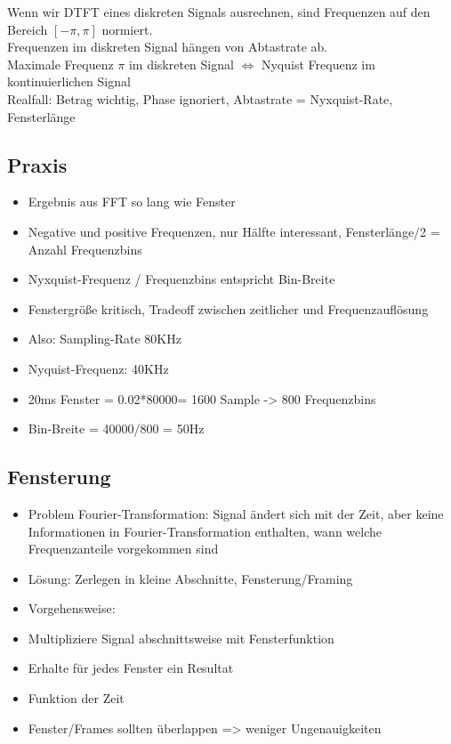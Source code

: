 \documentclass[a4paper,10pt,oneside]{article}
\begin{document}
Wenn wir DTFT eines diskreten Signals ausrechnen, sind Frequenzen auf den Bereich $[-\pi,\pi]$ normiert.\\
Frequenzen im diskreten Signal hängen von Abtastrate ab.\\
Maximale Frequenz $\pi$ im diskreten Signal $\Leftrightarrow$ Nyquist Frequenz im kontinuierlichen Signal \\
Realfall: Betrag wichtig, Phase ignoriert, Abtastrate = Nyxquist-Rate, Fensterlänge

\subsection{Praxis}
\begin{itemize}
	\item Ergebnis aus FFT so lang wie Fenster
	\item Negative und positive Frequenzen, nur Hälfte interessant, Fensterlänge/2 = Anzahl Frequenzbins
	\item Nyxquist-Frequenz / Frequenzbins entspricht Bin-Breite
	\item Fenstergröße kritisch, Tradeoff zwischen zeitlicher und Frequenzauflösung
	\item Also: Sampling-Rate 80KHz
	\item Nyquist-Frequenz: 40KHz
	\item 20ms Fenster = 0.02*80000= 1600 Sample -> 800 Frequenzbins
	\item Bin-Breite = 40000/800 = 50Hz
\end{itemize}

\subsection{Fensterung}
\begin{itemize}
	\item Problem Fourier-Transformation: Signal ändert sich mit der Zeit, aber keine Informationen in Fourier-Transformation enthalten, wann welche Frequenzanteile vorgekommen sind
	\item Lösung: Zerlegen in kleine Abschnitte, Fensterung/Framing
	\item Vorgehensweise:
	\item Multipliziere Signal abschnittsweise mit Fensterfunktion
	\item Erhalte für jedes Fenster ein Resultat
	\item Funktion der Zeit
	\item Fenster/Frames sollten überlappen => weniger Ungenauigkeiten
\end{itemize}
\end{document}
